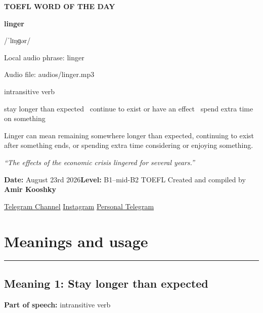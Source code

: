 \documentclass[11pt]{article}
\newcommand{\sectionrule}{\par\vspace{-0.5em}\noindent\textcolor{Accent}{\rule{\linewidth}{0.6pt}}\par}
\begin{document}
\begin{center}
{\sffamily\bfseries\color{Accent} TOEFL WORD OF THE DAY\par}
\vspace{8mm}
{\fontsize{42}{48}\selectfont\bfseries linger\par}
\vspace{2mm}
{\Large\sffamily\color{Accent} /ˈlɪŋɡər/\par}
\vspace{2mm}
{\small\sffamily Local audio phrase: linger\par}
{\small\sffamily Audio file: audios/linger.mp3\par}
\vspace{2mm}
{\large\sffamily\color{Muted} intransitive verb\par}
\vspace{5mm}
{\sffamily stay longer than expected \textbullet\ continue to exist or have an effect \textbullet\ spend extra time on something\par}
\vspace{6mm}
{\large Linger can mean remaining somewhere longer than expected, continuing to exist after something ends, or spending extra time considering or enjoying something.\par}
\vspace{6mm}
\begin{minipage}{0.84\textwidth}
\itshape “The effects of the economic crisis lingered for several years.”
\end{minipage}\par
\vspace{10mm}
\textbf{Date:} August 23rd 2026\quad\textbullet\quad \textbf{Level:} B1--mid-B2 TOEFL
\vfill
Created and compiled by \textbf{Amir Kooshky}\par
\vspace{2mm}
\href{https://t.me/KooshkyTOEFL}{Telegram Channel}\quad\textbullet\quad
\href{https://www.instagram.com/kooshkytoefl}{Instagram}\quad\textbullet\quad
\href{https://t.me/KooshkyTOEFL\_pv}{Personal Telegram}
\end{center}
\newpage
\tableofcontents
\newpage

\section{Meanings and usage}
\sectionrule
\subsection{Meaning 1: Stay longer than expected}
\textbf{Part of speech:} intransitive verb
\end{document}
